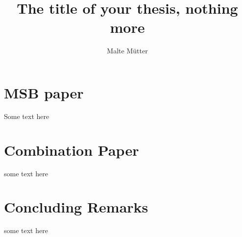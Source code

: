 \documentclass{thesis}
\title{The title of your thesis, nothing more}
\author{Malte Mütter}
\date{} %
\begin{document}
\frontmatter


\begin{summaryspacing}
  \tableofcontents*
\end{summaryspacing}


\mainmatter
{}


\chapter{MSB paper}
Some text here

\chapter{Combination Paper}
some text here

\chapter{Concluding Remarks}
some text here
\end{document}
